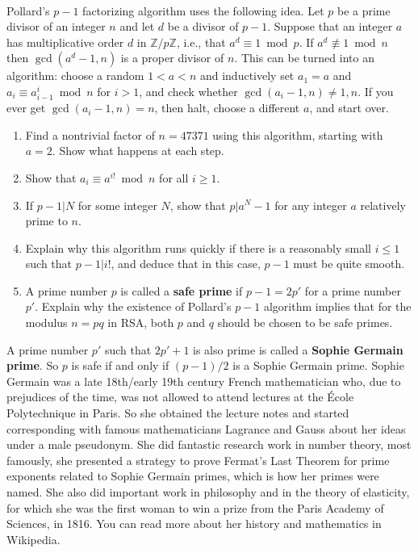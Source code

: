 \documentclass[11pt]{amsart}
\newcommand{\Z}{\mathbb{Z}}
\newcounter{problem}
\newenvironment{problem}[1][]%
{%
\stepcounter{problem} \vspace{.2cm} \noindent {\bf \arabic{problem}.} {\it #1}~ %
}{%
\vspace{.2cm}%
}
\begin{document}
\begin{problem}
Pollard's $p-1$ factorizing algorithm uses the following idea.  Let
$p$ be a prime divisor of an integer $n$ and let $d$ be a divisor of
$p-1$.  Suppose that an integer $a$ has multiplicative order $d$ in
$\Z/p\Z$, i.e., that $a^d \equiv 1 \bmod p$.  If
$a^d \not\equiv 1 \bmod n$ then $\gcd(a^d-1,n)$ is a proper divisor of
$n$.  This can be turned into an algorithm: choose a random $1 < a
< n$ and inductively set $a_1=a$ and $a_i \equiv a_{i-1}^i \bmod n$ for
$i > 1$, and check whether $\gcd(a_i-1,n) \neq 1,n$.  If you ever
get $\gcd(a_i-1,n)=n$, then halt, choose a different $a$, and start over.
\begin{enumerate} \renewcommand{\itemsep}{3mm}
\item Find a nontrivial factor of $n=47371$ using this algorithm,
starting with $a=2$.  Show what happens at each step.

\item Show that $a_i \equiv a^{i!} \bmod n$ for all $i \geq 1$.

\item If $p-1 | N$ for some integer $N$, show that $p | a^N-1$ for any
integer $a$ relatively prime to $n$.

\item Explain why this algorithm runs quickly if there is a reasonably
small $i \leq 1$ such that $p-1 | i!$, and  deduce that in this case,
$p-1$ must be quite smooth.  

\item A prime number $p$ is called a \textbf{safe prime} if $p-1 =
2p'$ for a prime number $p'$.  Explain why the existence of Pollard's
$p-1$ algorithm implies that for the modulus $n=pq$ in RSA, both $p$
and $q$ should be chosen to be safe primes.
\end{enumerate}

\medskip

A prime number $p'$ such that $2p'+1$ is also prime is called a
\textbf{Sophie Germain prime}.  So $p$ is safe if and only if
$(p-1)/2$ is a Sophie Germain prime.  Sophie Germain was a late
18th/early 19th century French mathematician who, due to prejudices of
the time, was not allowed to attend lectures at the \'Ecole
Polytechnique in Paris.  So she obtained the lecture notes and started
corresponding with famous mathematicians Lagrance and Gauss about her
ideas under a male pseudonym.  She did fantastic research work in
number theory, most famously, she presented a strategy to prove
Fermat's Last Theorem for prime exponents related to Sophie Germain
primes, which is how her primes were named.  She also did important
work in philosophy and in the theory of elasticity, for which she was
the first woman to win a prize from the Paris Academy of Sciences, in
1816.  You can read more about her history and mathematics in
Wikipedia.
\end{problem}

\vfill
\end{document}
